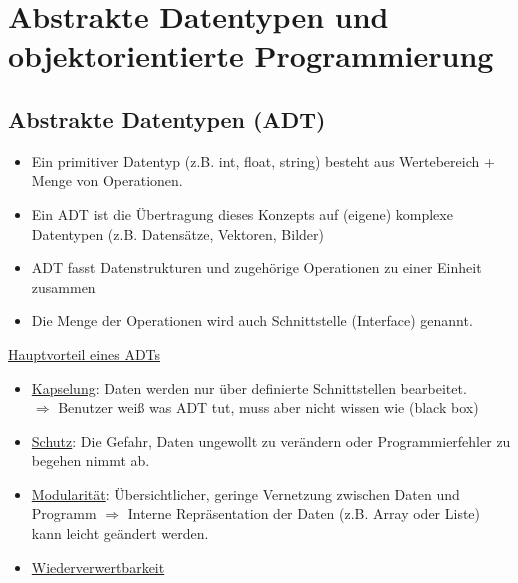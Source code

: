 \section{Abstrakte Datentypen und objektorientierte Programmierung}
\subsection{Abstrakte Datentypen (ADT)}
\begin{itemize}
    \item Ein primitiver Datentyp (z.B. int, float, string) besteht aus Wertebereich + Menge von Operationen.
    \item Ein ADT ist die Übertragung dieses Konzepts auf (eigene) komplexe Datentypen (z.B. Datensätze, Vektoren, Bilder) 
    \item ADT fasst Datenstrukturen und zugehörige Operationen zu einer Einheit zusammen
    \item Die Menge der Operationen wird auch Schnittstelle (Interface) genannt.
\end{itemize}
\underline{Hauptvorteil eines ADTs}
\begin{itemize}
    \item \underline{Kapselung}: Daten werden nur über definierte Schnittstellen bearbeitet. \\
    $\Rightarrow$ Benutzer weiß was ADT tut, muss aber nicht wissen wie (black box)
    \item \underline{Schutz}: Die Gefahr, Daten ungewollt zu verändern oder Programmierfehler zu begehen nimmt ab.
    \item \underline{Modularität}: Übersichtlicher, geringe Vernetzung zwischen Daten und Programm $\Rightarrow$ Interne Repräsentation der Daten (z.B. Array oder Liste) kann leicht geändert werden.
    \item \underline{Wiederverwertbarkeit}
\end{itemize}
